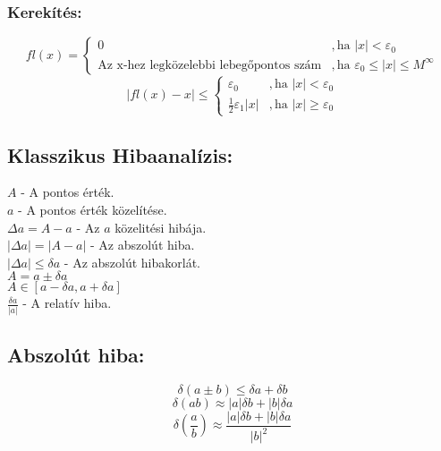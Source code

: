 \documentclass[11pt]{article}
\begin{document}
			\subsubsection{Kerekítés:}
				\begin{equation}
					fl(x)=
						\begin{cases}
							0 &,\text{ha } |x| < \varepsilon_0 \\
							\text{Az x-hez legközelebbi lebegőpontos szám} &,\text{ha } \varepsilon_0 \leq |x| \leq M^\infty
						\end{cases} 
				\end{equation}
				\begin{equation}
					|fl(x) - x| \leq
						\begin{cases}
							\varepsilon_0 &,\text{ha } |x| < \varepsilon_0 \\
							\frac{1}{2}\varepsilon_1|x| &,\text{ha } |x|\geq\varepsilon_0
						\end{cases}
				\end{equation}
				
		\subsection{Klasszikus Hibaanalízis:}
			$A$ - A pontos érték.\\
			$a$ - A pontos érték közelítése.\\			
			$\Delta a = A - a$ - Az $a$ közelitési hibája.\\			
			$|\Delta a| = |A-a|$ - Az abszolút hiba.\\			
			$|\Delta a| \leq \delta a$ - Az abszolút hibakorlát.\\			
			$A = a \pm \delta a$\\			
			$A \in \left[a-\delta a, a + \delta a\right]$\\			
			$\frac{\delta a}{|a|}$ - A relatív hiba.\\
			
		\subsection{Abszolút hiba:}
			\begin{equation}
				\delta(a \pm b) \leq \delta a + \delta b
			\end{equation}	
			\begin{equation}
				\delta(ab) \approx |a|\delta b + |b|\delta a
			\end{equation}
			\begin{equation}		
				\delta\left(\frac{a}{b}\right) \approx \frac{|a|\delta b + |b|\delta a}{|b|^2}
			\end{equation}
			
\end{document}
